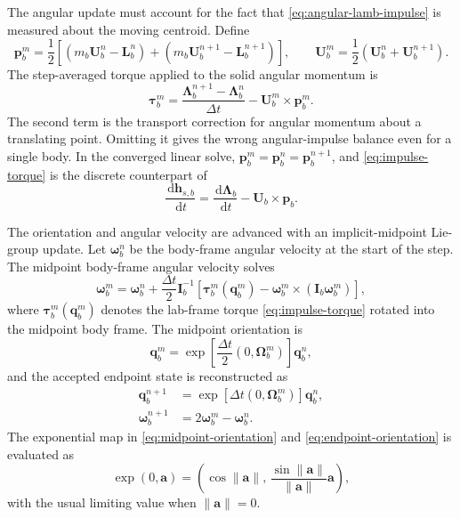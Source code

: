 \documentclass[11pt,a4paper]{article}
\newcommand{\dd}{\,\mathrm{d}}
\newcommand{\bU}{\bm{U}}
\newcommand{\bOmega}{\bm{\Omega}}
\newcommand{\bomega}{\bm{\omega}}
\newcommand{\bI}{\bm{I}}
\newcommand{\bL}{\bm{L}}
\newcommand{\bLambda}{\bm{\Lambda}}
\newcommand{\bp}{\bm{p}}
\newcommand{\bh}{\bm{h}}
\newcommand{\btau}{\bm{\tau}}
\newcommand{\quat}[1]{\mathbf{#1}}
\begin{document}
The angular update must account for the fact that
\eqref{eq:angular-lamb-impulse} is measured about the moving centroid.  Define
\begin{equation}
  \bp_{b}^{m}
  =
  \frac{1}{2}
  \left[
    \left(m_b\bU_b^n-\bL_b^n\right)
    +
    \left(m_b\bU_b^{n+1}-\bL_b^{n+1}\right)
  \right],
  \qquad
  \bU_b^m=\frac{1}{2}\left(\bU_b^n+\bU_b^{n+1}\right).
  \label{eq:midpoint-impulse}
\end{equation}
The step-averaged torque applied to the solid angular momentum is
\begin{equation}
  \btau_b^m
  =
  \frac{\bLambda_b^{n+1}-\bLambda_b^n}{\Delta t}
  -
  \bU_b^m\times\bp_b^m .
  \label{eq:impulse-torque}
\end{equation}
The second term is the transport correction for angular momentum about a
translating point.  Omitting it gives the wrong angular-impulse balance even for
a single body.  In the converged linear solve, $\bp_b^m=\bp_b^n=\bp_b^{n+1}$,
and \eqref{eq:impulse-torque} is the discrete counterpart of
\[
  \frac{\dd\bh_{s,b}}{\dd t}
  =
  \frac{\dd\bLambda_b}{\dd t}
  -
  \bU_b\times\bp_b .
\]

The orientation and angular velocity are advanced with an implicit-midpoint
Lie-group update.  Let $\bomega_b^n$ be the body-frame angular velocity at the
start of the step.  The midpoint body-frame angular velocity solves
\begin{equation}
  \bomega_b^m
  =
  \bomega_b^n
  +
  \frac{\Delta t}{2}
  \bI_b^{-1}
  \left[
    \btau_b^m(\quat{q}_b^m)
    -
    \bomega_b^m\times\left(\bI_b\bomega_b^m\right)
  \right],
  \label{eq:implicit-midpoint-omega}
\end{equation}
where $\btau_b^m(\quat{q}_b^m)$ denotes the lab-frame torque
\eqref{eq:impulse-torque} rotated into the midpoint body frame.  The midpoint
orientation is
\begin{equation}
  \quat{q}_b^m
  =
  \exp\left[
    \frac{\Delta t}{2}(0,\bOmega_b^m)
  \right]\quat{q}_b^n,
  \label{eq:midpoint-orientation}
\end{equation}
and the accepted endpoint state is reconstructed as
\begin{align}
  \quat{q}_b^{n+1}
  &=
  \exp\left[
    \Delta t(0,\bOmega_b^m)
  \right]\quat{q}_b^n,
  \label{eq:endpoint-orientation}\\
  \bomega_b^{n+1}
  &=
  2\bomega_b^m-\bomega_b^n .
  \label{eq:endpoint-angular-velocity}
\end{align}
The exponential map in \eqref{eq:midpoint-orientation} and
\eqref{eq:endpoint-orientation} is evaluated as
\[
  \exp(0,\bm{a})
  =
  \left(\cos\|\bm{a}\|,\,
  \frac{\sin\|\bm{a}\|}{\|\bm{a}\|}\bm{a}\right),
\]
with the usual limiting value when $\|\bm{a}\|=0$.
\end{document}
